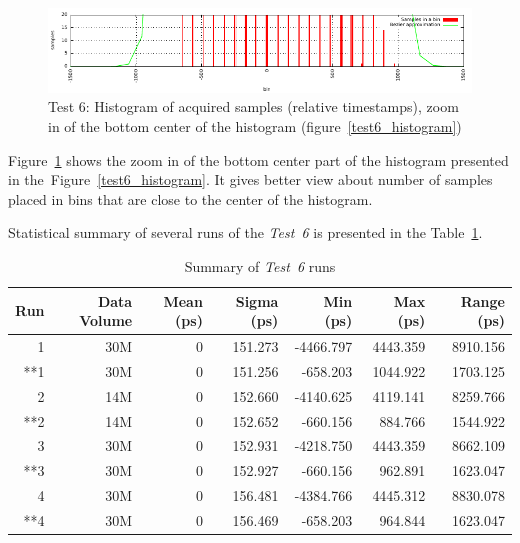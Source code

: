 \documentclass[a4paper, 12pt]{article}
\begin{document}
\begin{figure}[ht!]
  \centering
  \includegraphics[width=1\textwidth]{img/test6_histogram_zoomx.pdf}
  \caption{Test 6: Histogram of acquired samples (relative timestamps),
           zoom in of the bottom center of the histogram
           (figure~\ref{test6_histogram})}
  \label{test6_histogram_zoomx}
\end{figure}


Figure~\ref{test6_histogram_zoomx} shows the zoom in of the bottom center
part of the histogram presented in the~Figure~\ref{test6_histogram}.
It gives better view about number of samples placed in bins that are close to
the center of the histogram.

\FloatBarrier

Statistical summary of several runs of the \textit{Test~6} is presented in
the Table~\ref{table_test6_summary}.

\begin{table}[!htb]
  \centering
  \footnotesize
  \begin{tabular}{|r|r|r|r|r|r|r|}
    \hline {\bf Run} & {\bf Data Volume} & {\bf Mean (ps)} & {\bf Sigma (ps)} & {\bf Min (ps)} & {\bf Max (ps)} & {\bf Range (ps)}  \\
    \hline
    1                & 30M               &              0  & 151.273          & -4466.797      & 4443.359       & 8910.156      \\
    **1              & 30M               &              0  & 151.256          &  -658.203      & 1044.922       & 1703.125      \\
    2                & 14M               &              0  & 152.660          & -4140.625      & 4119.141       & 8259.766      \\
    **2              & 14M               &              0  & 152.652          &  -660.156      &  884.766       & 1544.922      \\
    3                & 30M               &              0  & 152.931          & -4218.750      & 4443.359       & 8662.109      \\
    **3              & 30M               &              0  & 152.927          &  -660.156      &  962.891       & 1623.047      \\
    4                & 30M               &              0  & 156.481          & -4384.766      & 4445.312       & 8830.078      \\
    **4              & 30M               &              0  & 156.469          &  -658.203      &  964.844       & 1623.047      \\
    \hline
  \end{tabular}
  \caption{Summary of \textit{Test~6} runs}
  \label{table_test6_summary}
\end{table}
\end{document}
